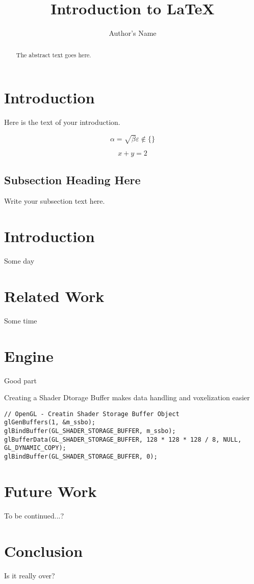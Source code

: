 \documentclass{article}
\begin{document}
\title{Introduction to \LaTeX{}}
\author{Author's Name}

\maketitle

\begin{abstract}
The abstract text goes here.
\end{abstract}

\newpage

\tableofcontents

\newpage

\section{Introduction}
Here is the text of your introduction.

\begin{equation}
    \label{simple_equation}
    \alpha = \sqrt{ \beta }
    \varepsilon \notin \{	\}
\end{equation}

\[
	x + y = 2
\]

\subsection{Subsection Heading Here}
Write your subsection text here.

\section{Introduction}
	Some day

\section{Related Work}
	Some time

\section{Engine}
	Good part

Creating a Shader Dtorage Buffer makes data handling and voxelization easier

\begin{lstlisting}
// OpenGL - Creatin Shader Storage Buffer Object
glGenBuffers(1, &m_ssbo);
glBindBuffer(GL_SHADER_STORAGE_BUFFER, m_ssbo);
glBufferData(GL_SHADER_STORAGE_BUFFER, 128 * 128 * 128 / 8, NULL, GL_DYNAMIC_COPY);
glBindBuffer(GL_SHADER_STORAGE_BUFFER, 0);
\end{lstlisting}

\section{Future Work}
	To be continued...?

\section{Conclusion}
	Is it really over?
\end{document}
